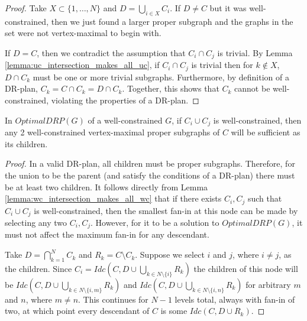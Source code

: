 \begin{proof}
Take $X\subset \{1,\ldots,N\}$ and $D=\bigcup_{i\in X}{C_i}$. If $D\neq C$ but it was well-constrained, then we just found a larger proper subgraph and the graphs in the set were not vertex-maximal to begin with.

If $D= C$, then we contradict the assumption that $C_i \cap C_j$ is trivial. By Lemma \ref{lemma:uc_intersection_makes_all_uc}, if $C_i \cap C_j$ is trivial then for $k\notin X$, $D\cap C_k$ must be one or more trivial subgraphs. Furthermore, by definition of a DR-plan, $C_k=C\cap C_k=D\cap C_k$. Together, this shows that $C_k$ cannot be well-constrained, violating the properties of a DR-plan.
\end{proof}



\begin{theorem}\label{theorem:main_trivial}
In $OptimalDRP(G)$ of a well-constrained $G$, if $C_i \cup C_j$ is well-constrained, then any 2 well-constrained vertex-maximal proper subgraphs of $C$ will be sufficient as its children.
\end{theorem}

\begin{proof}
In a valid DR-plan, all children must be proper subgraphs. Therefore, for the union to be the parent (and satisfy the conditions of a DR-plan) there must be at least two children. It follows directly from Lemma \ref{lemma:wc_intersection_makes_all_wc} that if there exists $C_i, C_j$ such that $C_i \cup C_j$ is well-constrained, then the smallest fan-in at this node can be made by selecting any two $C_i, C_j$.
However, for it to be a solution to $OptimalDRP(G)$, it must not affect the maximum fan-in for any descendant.

Take $D=\bigcap_{k=1}^N{C_k}$ and $R_k=C\setminus C_k$. Suppose we select $i$ and $j$, where $i\neq j$, as the children. Since
$C_i=Idc\left(C,D\cup\bigcup_{k\in N\setminus\{i\}}{R_k}\right)$
the children of this node will be
$Idc\left(C,D\cup\bigcup_{k\in N\setminus\{i,m\}}{R_k}\right)$
and
$Idc\left(C,D\cup\bigcup_{k\in N\setminus\{i,n\}}{R_k}\right)$
for arbitrary $m$ and $n$, where $m\neq n$. This continues for $N-1$ levels total, always with fan-in of two, at which point every descendant of $C$ is some $Idc(C,D\cup R_k)$.
\end{proof}

